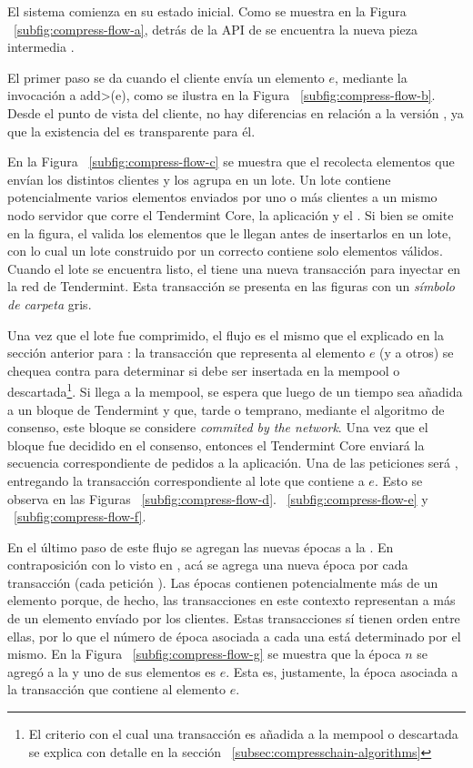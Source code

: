 El sistema comienza en su estado inicial.
Como se muestra en la Figura ~\ref{subfig:compress-flow-a}, detrás de la API de \setchain
se encuentra la nueva pieza intermedia \collector.

%

El primer paso se da cuando el cliente envía un elemento $e$, mediante la invocación a \<add>(e), como se
ilustra en la Figura ~\ref{subfig:compress-flow-b}.
Desde el punto de vista del cliente, no hay diferencias en relación a la versión \vanilla, ya que
la existencia del \collector es transparente para él.

%

En la Figura ~\ref{subfig:compress-flow-c} se muestra que el \collector recolecta elementos que envían los distintos
clientes y los agrupa en un lote.
Un lote contiene potencialmente varios elementos enviados por uno o más clientes a un mismo nodo servidor
que corre el Tendermint Core, la aplicación y el \collector.
Si bien se omite en la figura, el \collector valida los elementos que le llegan antes de insertarlos en un lote,
con lo cual un lote construido por un \collector correcto contiene solo elementos válidos.
Cuando el lote se encuentra listo, el \collector tiene una nueva transacción para inyectar en la red de Tendermint.
Esta transacción se presenta en las figuras con un \textit{símbolo de carpeta} gris.

%

Una vez que el lote fue comprimido, el flujo es el mismo que el explicado en la sección anterior para \vanilla: la transacción
que representa al elemento $e$ (y a otros) se chequea contra \CheckTx para determinar si debe ser insertada
en la mempool o descartada\footnote{El criterio con el cual una transacción es añadida a la mempool o descartada
se explica con detalle en la sección ~\ref{subsec:compresschain-algorithms}}.
%
Si llega a la mempool, se espera que luego de un tiempo sea añadida a un bloque de Tendermint y que,
tarde o temprano, mediante el algoritmo de consenso, este bloque se considere \textit{commited by the network}.
%
Una vez que el bloque fue decidido en el consenso, entonces el Tendermint Core enviará
la secuencia correspondiente de pedidos a la aplicación.
%
Una de las peticiones será \DeliverTx, entregando la transacción correspondiente al lote que contiene a $e$.
%
Esto se observa en las Figuras ~\ref{subfig:compress-flow-d}. ~\ref{subfig:compress-flow-e} y ~\ref{subfig:compress-flow-f}.

%
En el último paso de este flujo se agregan las nuevas épocas a la \setchain.
En contraposición con lo visto en \vanilla, acá se agrega una nueva época por cada transacción (cada petición \DeliverTx).
Las épocas contienen potencialmente más de un elemento porque, de hecho, las transacciones en este contexto representan a más de un elemento
envíado por los clientes.
Estas transacciones sí tienen orden entre ellas, por lo que el número de época asociada a cada una está determinado por el mismo.
En la Figura ~\ref{subfig:compress-flow-g} se muestra que la época $n$ se agregó a la \setchain y uno de sus elementos es $e$. Esta es, justamente, la época asociada
a la transacción que contiene al elemento $e$.


